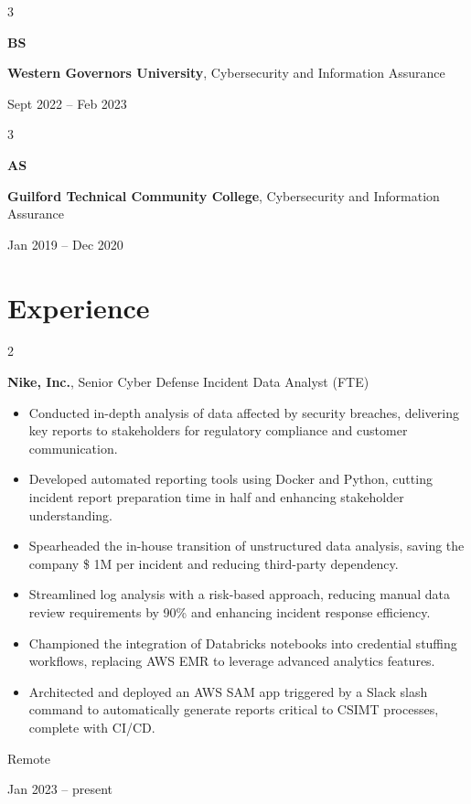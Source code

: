\documentclass[10pt, letterpaper]{article}
\newenvironment{highlights}{
    \begin{itemize}[
        topsep=0.10 cm,
        parsep=0.10 cm,
        partopsep=0pt,
        itemsep=0pt,
        leftmargin=0.4 cm + 10pt
    ]
}{
    \end{itemize}
} %
\newenvironment{twocolentry}[2][]{
    \onecolentry
    \def\secondColumn{#2}
    \setcolumnwidth{\fill, 4.5 cm}
    \begin{paracol}{2}
}{
    \switchcolumn \raggedleft \secondColumn
    \end{paracol}
    \endonecolentry
} %
\newenvironment{threecolentry}[3][]{
    \onecolentry
    \def\thirdColumn{#3}
    \setcolumnwidth{1 cm, \fill, 4.5 cm}
    \begin{paracol}{3}
    {\raggedright #2} \switchcolumn
}{
    \switchcolumn \raggedleft \thirdColumn
    \end{paracol}
    \endonecolentry
} %
\begin{document}
        \vspace{0.2 cm}

        \begin{threecolentry}{\textbf{BS}}{
            Sept 2022 – Feb 2023
        }
            \textbf{Western Governors University}, Cybersecurity and Information Assurance
        \end{threecolentry}

        \vspace{0.2 cm}

        \begin{threecolentry}{\textbf{AS}}{
            Jan 2019 – Dec 2020
        }
            \textbf{Guilford Technical Community College}, Cybersecurity and Information Assurance
        \end{threecolentry}


    
    \section{Experience}



        
        \begin{twocolentry}{
            Remote

        Jan 2023 – present
        }
            \textbf{Nike, Inc.}, Senior Cyber Defense Incident Data Analyst (FTE)
            \begin{highlights}
                \item Conducted in-depth analysis of data affected by security breaches, delivering key reports to stakeholders for regulatory compliance and customer communication.
                \item Developed automated reporting tools using Docker and Python, cutting incident report preparation time in half and enhancing stakeholder understanding.
                \item Spearheaded the in-house transition of unstructured data analysis, saving the company \$ 1M per incident and reducing third-party dependency.
                \item Streamlined log analysis with a risk-based approach, reducing manual data review requirements by 90\% and enhancing incident response efficiency.
                \item Championed the integration of Databricks notebooks into credential stuffing workflows, replacing AWS EMR to leverage advanced analytics features.
                \item Architected and deployed an AWS SAM app triggered by a Slack slash command to automatically generate reports critical to CSIMT processes, complete with CI/CD.
            \end{highlights}
        \end{twocolentry}
\end{document}
